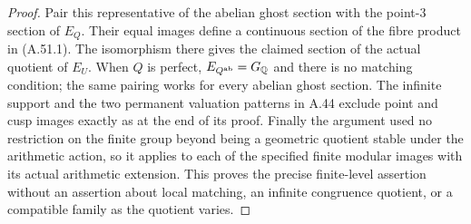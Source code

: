 \begin{proof}
Pair this representative of the abelian ghost section with
the point-$3$ section of $E_Q$.  Their equal images define
a continuous section of the fibre product in (A.51.1).
The isomorphism there gives the claimed section of the
actual quotient of $E_U$.  When $Q$ is perfect,
$E_{Q^{\rm ab}}=G_\mathbb Q$ and there is no matching condition;
the same pairing works for every abelian ghost section.
The infinite support and the two permanent valuation
patterns in A.44 exclude point and cusp images exactly
as at the end of its proof.  Finally the argument used no
restriction on the finite group beyond being a geometric
quotient stable under the arithmetic action, so it applies
to each of the specified finite modular images with its
actual arithmetic extension.  This proves the precise
finite-level assertion without an assertion about local
matching, an infinite congruence quotient, or a compatible
family as the quotient varies.
\end{proof}
